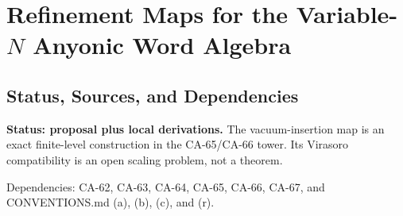 
\section{Refinement Maps for the Variable-\(N\) Anyonic Word Algebra}
\label{sec:variable-n-refinement-maps}

\subsection{Status, Sources, and Dependencies}

\textbf{Status: proposal plus local derivations.}  The vacuum-insertion map is
an exact finite-level construction in the CA-65/CA-66 tower.  Its Virasoro
compatibility is an open scaling problem, not a theorem.

Dependencies: CA-62, CA-63, CA-64, CA-65, CA-66, CA-67, and CONVENTIONS.md
(a), (b), (c), and (r).

